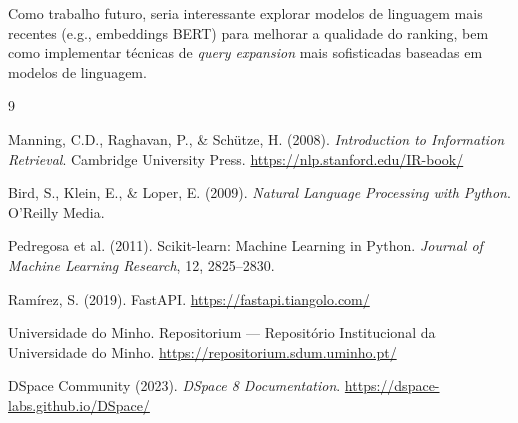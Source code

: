 \documentclass[12pt,a4paper]{article}
\begin{document}
Como trabalho futuro, seria interessante explorar modelos de linguagem mais recentes (e.g., embeddings BERT) para melhorar a qualidade do ranking, bem como implementar técnicas de \emph{query expansion} mais sofisticadas baseadas em modelos de linguagem.

\newpage
\begin{thebibliography}{9}

Manning, C.D., Raghavan, P., \& Schütze, H. (2008).
\textit{Introduction to Information Retrieval}.
Cambridge University Press.
\url{https://nlp.stanford.edu/IR-book/}

Bird, S., Klein, E., \& Loper, E. (2009).
\textit{Natural Language Processing with Python}.
O'Reilly Media.

Pedregosa et al. (2011).
Scikit-learn: Machine Learning in Python.
\textit{Journal of Machine Learning Research}, 12, 2825--2830.

Ramírez, S. (2019).
FastAPI. \url{https://fastapi.tiangolo.com/}

Universidade do Minho.
Repositorium --- Repositório Institucional da Universidade do Minho.
\url{https://repositorium.sdum.uminho.pt/}

DSpace Community (2023).
\textit{DSpace 8 Documentation}.
\url{https://dspace-labs.github.io/DSpace/}

\end{thebibliography}
\end{document}
